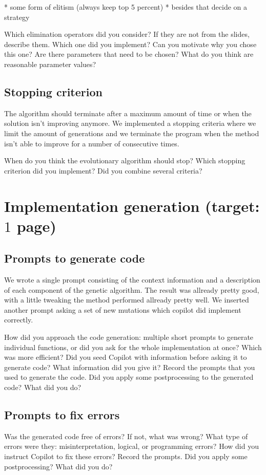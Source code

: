 \documentclass[a4paper,10pt]{article}
\newcommand{\ReplaceMe}[1]{{\color{blue}#1}}
\begin{document}
* some form of elitism (always keep top 5 percent)
* besides that decide on a strategy


\ReplaceMe{Which elimination operators did you consider? If they are not from the slides, describe them. Which one did you implement? Can you motivate why you chose this one? Are there parameters that need to be chosen? What do you think are reasonable parameter values?} 

\subsection{Stopping criterion}
The algorithm should terminate after a maximum amount of time or when the solution isn't improving anymore. We implemented a stopping criteria where we limit the amount of generations and we terminate the program when the method isn't able to improve for a number of consecutive times. 


\ReplaceMe{When do you think the evolutionary algorithm should stop? Which stopping criterion did you implement? Did you combine several criteria?}

\section{Implementation generation \hfill(target: $1$ page)}


\subsection{Prompts to generate code}

We wrote a single prompt consisting of the context information and a description of each component of the genetic algorithm. The result was allready pretty good, with a little tweaking the method performed allready pretty well. We inserted another prompt asking a set of new mutations which copilot did implement correctly.

\ReplaceMe{How did you approach the code generation: multiple short prompts to generate individual functions, or did you ask for the whole implementation at once? Which was more efficient? Did you seed Copilot with information before asking it to generate code? What information did you give it? Record the prompts that you used to generate the code. Did you apply some postprocessing to the generated code? What did you do?}

\subsection{Prompts to fix errors}
\ReplaceMe{Was the generated code free of errors? If not, what was wrong? What type of errors were they: misinterpretation, logical, or programming errors? How did you instruct Copilot to fix these errors? Record the prompts. Did you apply some postprocessing? What did you do?}
\end{document}
